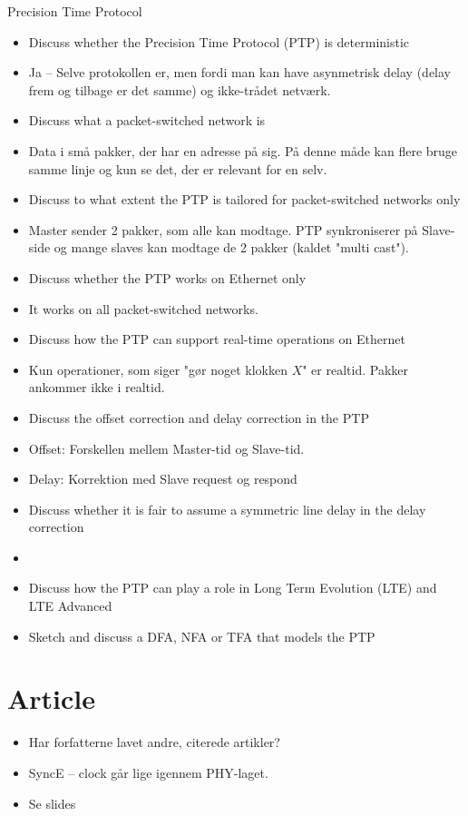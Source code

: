 \documentclass[oneside, 10pt]{article}
\begin{document}
Precision Time Protocol
\begin{itemize}
	\item Discuss whether the Precision Time Protocol (PTP) is deterministic
	\item[] Ja -- Selve protokollen er, men fordi man kan have asynmetrisk delay (delay frem og tilbage er det samme) og ikke-trådet netværk.

	\item Discuss what a packet-switched network is
	\item[]  Data i små pakker, der har en adresse på sig. 
	På denne måde kan flere bruge samme linje og kun se det, der er relevant for en selv.

	\item  Discuss to what extent the PTP is tailored for packet-switched networks only
	\item[] Master sender 2 pakker, som alle kan modtage. 
	PTP synkroniserer på Slave-side og mange slaves kan modtage de 2 pakker (kaldet "multi cast").

	\item Discuss whether the PTP works on Ethernet only
	\item[] It works on all packet-switched networks.

	\item Discuss how the PTP can support real-time operations on Ethernet
	\item[] Kun operationer, som siger "gør noget klokken $X$" er realtid.
	Pakker ankommer ikke i realtid. 

	\item Discuss the offset correction and delay correction in the PTP
	\item[] Offset: Forskellen mellem Master-tid og Slave-tid.
	\item[] Delay: Korrektion med Slave request og respond

	\item Discuss whether it is fair to assume a symmetric line delay in the delay correction
	\item[]

	\item Discuss how the PTP can play a role in Long Term Evolution (LTE) and LTE Advanced
	\item Sketch and discuss a DFA, NFA or TFA that models the PTP
\end{itemize}

\section{Article}
\begin{itemize}
	\item Har forfatterne lavet andre, citerede artikler?
	\item SyncE -- clock går lige igennem PHY-laget.
	\item Se slides
\end{itemize}
\end{document}
